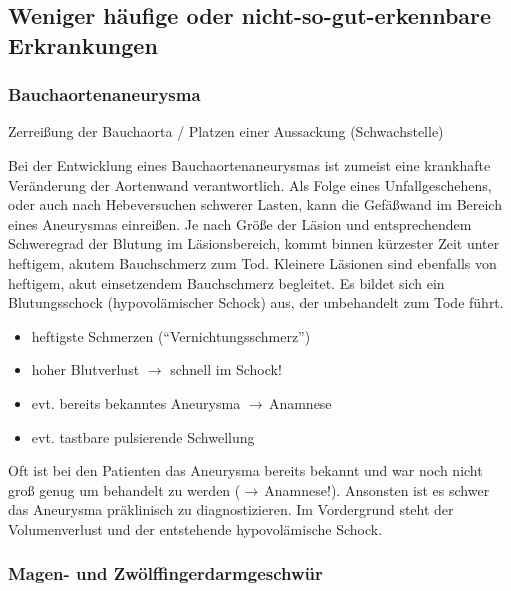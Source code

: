 \subsection{Weniger häufige oder nicht-so-gut-erkennbare Erkrankungen}



\subsubsection{Bauchaortenaneurysma}

Zerreißung der Bauchaorta / Platzen  einer Aussackung
(Schwachstelle)

\gMarried
{%
Bei der Entwicklung eines Bauchaortenaneurysmas ist zumeist
eine krankhafte Veränderung der Aortenwand
verantwortlich. Als Folge eines Unfallgeschehens,
oder auch nach Hebeversuchen schwerer Lasten, kann die
Gefäßwand im Bereich eines Aneurysmas einreißen. Je nach
Größe der Läsion und entsprechendem Schweregrad der Blutung
im Läsionsbereich, kommt binnen kürzester Zeit unter
heftigem, akutem Bauchschmerz zum Tod. Kleinere Läsionen
sind ebenfalls von heftigem, akut einsetzendem Bauchschmerz
begleitet. Es bildet sich ein Blutungsschock (hypovolämischer
Schock) aus, der unbehandelt zum Tode führt.

}
{

\begin{itemize}
    \item heftigste Schmerzen
("`Vernichtungsschmerz"')
\item     hoher Blutverlust ${\rightarrow}$ schnell im 
Schock!
\item evt. bereits bekanntes Aneurysma
${\rightarrow}$\,Anamnese
\item evt. tastbare pulsierende Schwellung
\end{itemize}
}

Oft ist bei den Patienten das Aneurysma bereits bekannt und
war noch nicht groß genug um behandelt zu werden
(${\rightarrow}$\,Anamnese!). Ansonsten ist es schwer das
Aneurysma präklinisch zu diagnostizieren. Im Vordergrund
steht der Volumenverlust und der entstehende hypovolämische
Schock. 



\subsubsection{Magen- und Zwölffingerdarmgeschwür}

